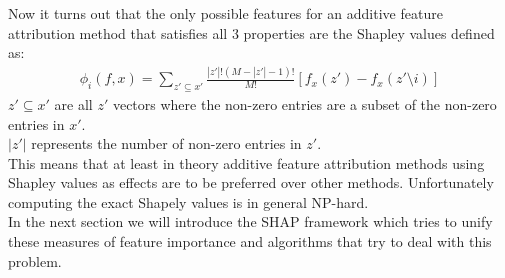 \documentclass[conference]{IEEEtran}
\begin{document}
Now it turns out that the only possible features for an additive feature attribution method that satisfies all 3 properties are the Shapley values defined as:\\
\begin{align}\label{ShapleyEquation}
\phi_i(f, x) = \sum_{z' \subseteq x'} \frac{|z'|!(M - |z'| - 1)!}{M!}[f_x(z') - f_x(z' \setminus i)]
\end{align}
$z' \subseteq x'$ are all $z'$ vectors where the non-zero entries are a subset of the non-zero entries in $x'$.\\
$|z'|$ represents the number of non-zero entries in $z'$.\\

This means that at least in theory additive feature attribution methods using Shapley values as effects are to be preferred over other methods. 
Unfortunately computing the exact Shapely values is in general NP-hard. \cite{b20}\\
In the next section we will introduce the SHAP framework which tries to unify these measures of feature importance and algorithms that try to deal with this problem.
\end{document}
